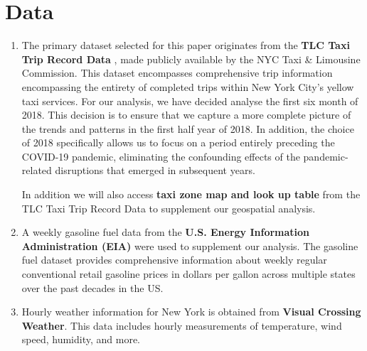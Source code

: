 \documentclass[11pt]{article}
\begin{document}
\section{Data}
\begin{enumerate} 
    \item The primary dataset selected for this paper originates from the \textbf{TLC Taxi Trip Record Data} \cite{TLC_taxi_data}, made publicly available by the NYC Taxi \& Limousine Commission. This dataset encompasses comprehensive trip information encompassing the entirety of completed trips within New York City's yellow taxi services.     
    For our analysis, we have decided analyse the first six month of 2018. This decision is to ensure that we capture a more complete picture of the trends and patterns in the first half year of 2018. In addition, the choice of 2018 specifically allows us to focus on a period entirely preceding the COVID-19 pandemic, eliminating the confounding effects of the pandemic-related disruptions that emerged in subsequent years. 

    In addition we will also access \textbf{taxi zone map and look up table} from the TLC Taxi Trip Record Data to supplement our geospatial analysis.

    \item A weekly gasoline fuel data from the \textbf{U.S. Energy Information Administration (EIA)} \cite{Gasoline_data} were used to supplement our analysis. The gasoline fuel dataset provides comprehensive information about weekly regular conventional retail gasoline prices in dollars per gallon across multiple states over the past decades in the US.
    

    \item Hourly weather information for New York is obtained from \textbf{Visual Crossing Weather}\cite{weather_data}. This data includes hourly measurements of temperature, wind speed, humidity, and more.

\end{enumerate}



\end{document}
